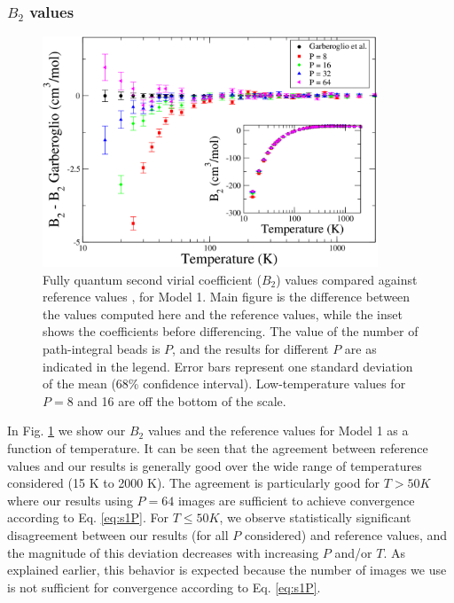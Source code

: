             \subsubsection{$B_2$ values}
                \begin{figure}[!htbp]
                    \centering
                    \includegraphics[width=10cm,keepaspectratio]{Chapter-4/Figures/s1GarberoglioAll.png}
                    \caption{Fully quantum second virial coefficient ($B_2$) values compared against reference values \cite{Garberoglio2014}, for Model 1. Main figure is the difference between the values computed here and the reference values, while the inset shows the coefficients before differencing. The value of the number of path-integral beads is $P$, and the results for different $P$ are as indicated in the legend. Error bars represent one standard deviation of the mean (68\% confidence interval). Low-temperature values for $P = 8$ and 16 are off the bottom of the scale.}
                    \label{fig:r0}
                \end{figure}
                In Fig. \ref{fig:r0} we show our $B_2$ values and the reference values for Model 1 as a function of temperature. It can be seen that the agreement between reference values and our results is generally good over the wide range of temperatures considered (15 K to 2000 K). The agreement is particularly good for $T > 50 K$ where our results using $P = 64$ images are sufficient to achieve convergence according to Eq. \eqref{eq:s1P}. For $T \le 50 K$, we observe statistically significant disagreement between our results (for all $P$ considered) and reference values, and the magnitude of this deviation decreases with increasing $P$ and/or $T$. As explained earlier, this behavior is expected because the number of images we use is not sufficient for convergence according to Eq. \eqref{eq:s1P}.


